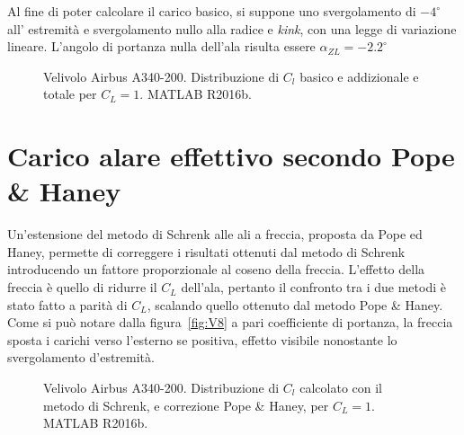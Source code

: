Al fine di poter calcolare il carico basico, si suppone uno svergolamento di $-4^\circ $ all' estremità e svergolamento nullo alla radice e {\itshape kink}, con una legge di variazione lineare. L’angolo di portanza nulla dell’ala risulta essere $ \alpha_{ZL}=-2.2^\circ$

\begin{figure}[h!]
	\centering
	\caption{\footnotesize Velivolo Airbus A340-200. Distribuzione di $C_l$ basico e addizionale e totale per $C_L = 1$. MATLAB R2016b. }
	\label{fig:V6}
\end{figure}


\section{Carico alare effettivo secondo Pope \& Haney}
Un’estensione del metodo di Schrenk alle ali a freccia, proposta da Pope ed Haney, permette di correggere i risultati ottenuti dal metodo di Schrenk introducendo un fattore proporzionale al coseno della freccia. L'effetto della freccia è quello di ridurre il $C_L$ dell'ala, pertanto il confronto tra i due metodi è stato fatto a parità di $C_L$, scalando quello ottenuto dal metodo Pope \& Haney.
Come si può notare dalla figura~\vref{fig:V8} a pari coefficiente di portanza, la freccia sposta i carichi verso l’esterno se positiva, effetto visibile nonostante lo svergolamento d'estremità. 

\begin{figure}[h!]
	\centering
	\caption{\footnotesize Velivolo Airbus A340-200. Distribuzione di $C_l$ calcolato con il metodo di Schrenk, e correzione Pope \& Haney, per $C_L=1$. MATLAB R2016b. }
	\label{fig:V8}
\end{figure}

